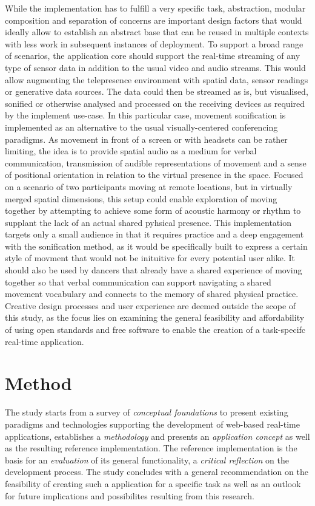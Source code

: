 While the implementation has to fulfill a very specific task, abstraction, modular composition and separation of concerns are important design factors that would ideally allow to establish an abstract base that can be reused in multiple contexts with less work in subsequent instances of deployment.
To support a broad range of scenarios, the application core should support the real-time streaming of any type of sensor data in addition to the usual video and audio streams.
This would allow augmenting the telepresence environment with spatial data, sensor readings or generative data sources.
The data could then be streamed as is, but visualised, sonified or otherwise analysed and processed on the receiving devices as required by the implement use-case.
In this particular case, movement sonification is implemented as an alternative to the usual visually-centered conferencing paradigms.
As movement in front of a screen or with headsets can be rather limiting, the idea is to provide spatial audio as a medium for verbal communication, transmission of audible representations of movement and a sense of positional orientation in relation to the virtual presence in the space.
Focused on a scenario of two participants moving at remote locations, but in virtually merged spatial dimensions, this setup could enable exploration of moving together by attempting to achieve some form of acoustic harmony or rhythm to supplant the lack of an actual shared pyhsical presence.
This implementation targets only a small audience in that it requires practice and a deep engagement with the sonification method, as it would be specifically built to express a certain style of movment that would not be inituitive for every potential user alike.
It should also be used by dancers that already have a shared experience of moving together so that verbal communication can support navigating a shared movement vocabulary and connects to the memory of shared physical practice.
Creative design processes and user experience are deemed outside the scope of this study, as the focus lies on examining the general feasibility and affordability of using open standards and free software to enable the creation of a task-specifc real-time application.

\section{Method}

The study starts from a survey of \emph{conceptual foundations} to present existing paradigms and technologies supporting the development of web-based real-time applications, establishes a \emph{methodology} and presents an \emph{application concept} as well as the resulting {reference implementation}.
The reference implementation is the basis for an \emph{evaluation} of its general functionality, a \emph{critical reflection} on the development process.
The study concludes with a general recommendation on the feasibility of creating such a  application for a specific task as well as an outlook for future implications and possibilites resulting from this research.
